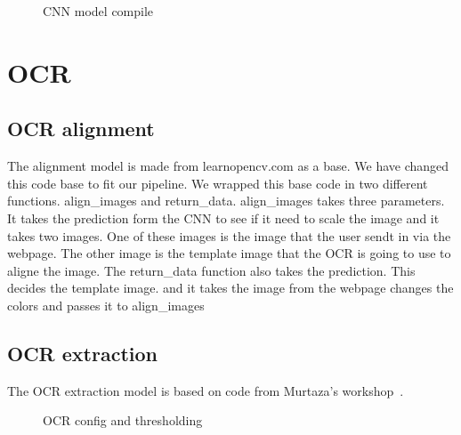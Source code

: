 \begin{figure}[h]
    \caption{CNN model compile}
    \label{fig:CNN compile}

\end{figure}

\section{OCR}\label{sec:OCR_implementation}

\subsection{OCR alignment}\label{subsec:ocr-alignment}

The alignment model is made from learnopencv.com\cite{OpenCVAlignment} as a base.
We have changed this code base to fit our pipeline.
We wrapped this base code in two different functions.
align\_images and return\_data.
align\_images takes three parameters.
It takes the prediction form the CNN to see if it need to scale the image and it takes two images.
One of these images is the image that the user sendt in via the webpage.
The other image is the template image that the OCR is going to use to aligne the image.
The return\_data function also takes the prediction.
This decides the template image.
and it takes the image from the webpage changes the colors and passes it to align\_images

\subsection{OCR extraction}\label{subsec:ocr-extraction}

The OCR extraction model is based on code from Murtaza's workshop~\cite{TextDetection}.

\begin{figure}[h]
    \caption{OCR config and thresholding}
    \label{fig:OCR config/thresholding}
\end{figure}

